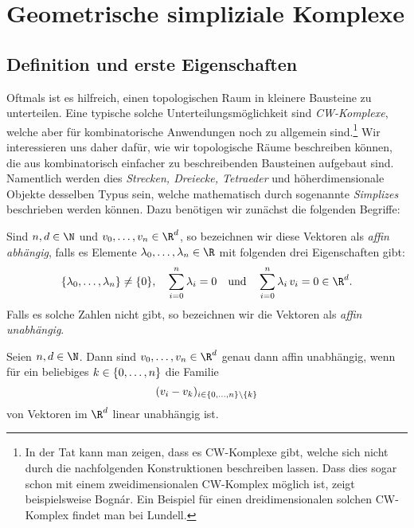 \chapter{Geometrische simpliziale Komplexe}
\section{Definition und erste Eigenschaften} %
Oftmals ist es hilfreich, einen topologischen Raum in kleinere Bausteine zu
unterteilen. Eine typische solche Unterteilungsmöglichkeit sind \emph{CW-Komplexe}, welche
aber für kombinatorische Anwendungen noch zu allgemein sind.\footnote{%
    In der Tat kann man zeigen, dass es CW-Komplexe gibt, welche sich nicht
    durch die nachfolgenden Konstruktionen beschreiben lassen. Dass dies sogar
    schon mit einem zweidimensionalen CW-Komplex möglich ist, zeigt
    beispielsweise Bognár\cite{artcle:bognar77}. Ein Beispiel für einen
    dreidimensionalen solchen CW-Komplex findet man bei
    Lundell\cite[Ch.\,III,]{bookc:lundell69}.%
}
Wir interessieren uns daher dafür, wie wir topologische Räume beschreiben
können, die aus kombinatorisch einfacher zu beschreibenden Bausteinen aufgebaut
sind. Namentlich werden dies \emph{Strecken, Dreiecke, Tetraeder} und
höherdimensionale Objekte desselben Typus sein, welche mathematisch durch
sogenannte \emph{Simplizes} beschrieben werden können. Dazu benötigen wir
zunächst die folgenden Begriffe:

\begin{thDef}
    Sind $n,d\in\N$ und $v_0,\ldots,v_n\in\R^d$, so bezeichnen wir diese
    Vektoren als \emph{affin abhängig}, falls es Elemente
    $\lambda_0,\ldots,\lambda_n \in\R$ mit folgenden drei Eigenschaften gibt:
    \[ \{\lambda_0,\ldots,\lambda_n\} \neq \{0\}, \quad \isum^n \lambda_i = 0
    \qundq \isum^n \lambda_i\,v_i = 0 \in\R^d.\] 
    Falls es solche Zahlen nicht gibt, so bezeichnen wir die Vektoren als
    \emph{affin unabhängig}.
\end{thDef}

\begin{thLemma}
    \label{gsc:iffaffinlyindependet}
    Seien $n,d\in\N$. Dann sind $v_0,\ldots,v_n\in\R^d$ genau dann affin
    unabhängig, wenn für ein beliebiges $k\in\{0,\ldots,n\}$ die Familie
    \[  (v_i - v_k)_{i \in\{0,\ldots,n\}\setminus\{k\}} \] 
    von Vektoren im $\R^d$ linear unabhängig ist.
\end{thLemma}

